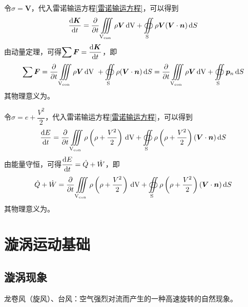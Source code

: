 \sssection[动量方程]

令$\sigma = \bm{V}$，代入雷诺输运方程\eqref{雷诺输运方程}，可以得到
\begin{equation}
	\dfrac{{\rm{d}} \bm{K}}{{\rm{d}} t} = \dfrac{\partial }{\partial t} \iiint\limits_{\text{V}_{\text{con}}} \rho \bm{V}\, {\rm{d}} \text{V} + \oiint\limits_{\text{S}}\rho \bm{V}(\bm{V} \cdot \bm{n}) \, {\rm{d}} S 
\end{equation}
由动量定理，可得$\displaystyle \sum \bm{F} = \dfrac{{\rm{d}} \bm{K}}{{\rm{d}} t}$，即
\begin{equation}
	\sum \bm{F} = \dfrac{\partial }{\partial t} \iiint\limits_{\text{V}_{\text{con}}} \rho \bm{V}\, {\rm{d}} \text{V} \,\,+ \oiint\limits_{\text{S}}\rho (\bm{V} \cdot \bm{n}) \, {\rm{d}} S  = \dfrac{\partial }{\partial t} \iiint\limits_{\text{V}_{\text{con}}} \rho\bm{V} \, {\rm{d}} \text{V} + \oiint\limits_{\text{S}} \bm{p}_n \, {\rm{d}} S 
\end{equation}
其物理意义为\red[控制体所受合外力$=$控制体内动量的增加率$+$净流出控制面的动量流量]。
\vspace*{1em}

\sssection[能量方程]

令$\sigma = e + \dfrac{V^2}{2}$，代入雷诺输运方程\eqref{雷诺输运方程}，可以得到
\begin{equation}
	\dfrac{{\rm{d}} E}{{\rm{d}} t} = \dfrac{\partial }{\partial t} \iiint\limits_{\text{V}_{\text{con}}} \rho \left(\rho + \dfrac{V^2}{2}\right) \, {\rm{d}} \text{V} + \oiint\limits_{\text{S}}\rho \left(\rho + \dfrac{V^2}{2}\right) (\bm{V} \cdot \bm{n}) \, {\rm{d}} S 
\end{equation}
由能量守恒，可得$\dfrac{{\rm{d}} E}{{\rm{d}} t} = \dot{Q} + \dot{W}$，即
\begin{equation}
	\dot{Q} + \dot{W} = \dfrac{\partial }{\partial t} \iiint\limits_{\text{V}_{\text{con}}} \rho \left(\rho + \dfrac{V^2}{2}\right) \, {\rm{d}} \text{V} + \oiint\limits_{\text{S}}\rho \left(\rho + \dfrac{V^2}{2}\right) (\bm{V} \cdot \bm{n}) \, {\rm{d}} S 
\end{equation}
其物理意义为\red[外界对控制体的传热率和净输入功率$=$控制体内能量的增加率$+$净流出控制面的能量流量]。


\section{漩涡运动基础}
\subsection{漩涡现象}
\sssection[自然界]

龙卷风（旋风）、台风：空气强烈对流而产生的一种高速旋转的自然现象。
\vspace*{1em}

